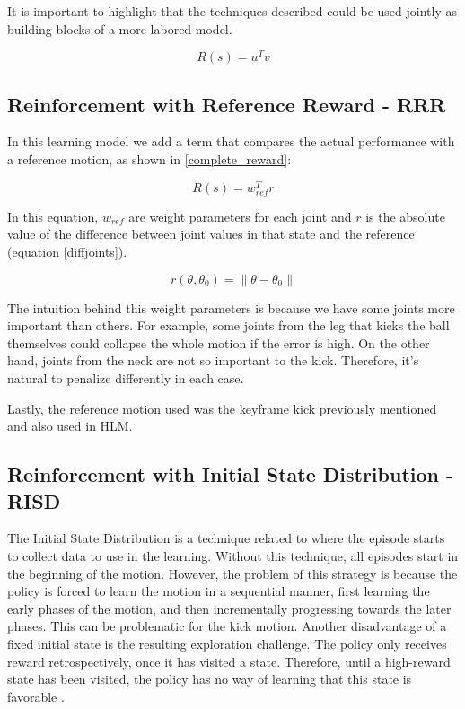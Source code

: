 It is important to highlight that the techniques described could be used jointly as building blocks of a more labored model.

\begin{equation}
R(s) = u^{T}v
\label{naive_reward}
\end{equation}

\subsection{Reinforcement with Reference Reward - RRR }
In this learning model we add a term that compares the actual performance with a reference motion, as shown in \ref{complete_reward}:

\begin{equation}
R(s) = w_{ref}^{T}r
\label{complete_reward}
\end{equation}

In this equation, $w_{ref}$ are weight parameters for each joint and $r$ is the absolute value of the difference between joint values in that state and the reference (equation \ref{diffjoints}).

\begin{equation}
r(\theta, \theta_{0}) = \lVert\theta - \theta_{0}\rVert
\label{diffjoints}
\end{equation}

The intuition behind this weight parameters is because we have some joints more important than others. For example, some joints from the leg that kicks the ball themselves could collapse the whole motion if the error is high. On the other hand, joints from the neck are not so important to the kick. Therefore, it's natural to penalize differently in each case.

Lastly, the reference motion used was the keyframe kick previously mentioned and also used in HLM.


\subsection{Reinforcement with Initial State Distribution - RISD}\label{risd}

The Initial State Distribution is a technique related to where the episode starts to collect data to use in the learning. Without this technique, all episodes start in the beginning of the motion. However, the problem of this strategy is because the policy is forced to learn the motion in a sequential manner, first learning the early phases of the motion, and then incrementally progressing towards the later phases. This can be problematic for the kick motion. Another disadvantage of a fixed initial state is the resulting exploration challenge. The policy only receives reward retrospectively, once it has visited a state. Therefore, until a high-reward state has been visited, the policy has no way of learning that this state is favorable \cite{peng2018}.

